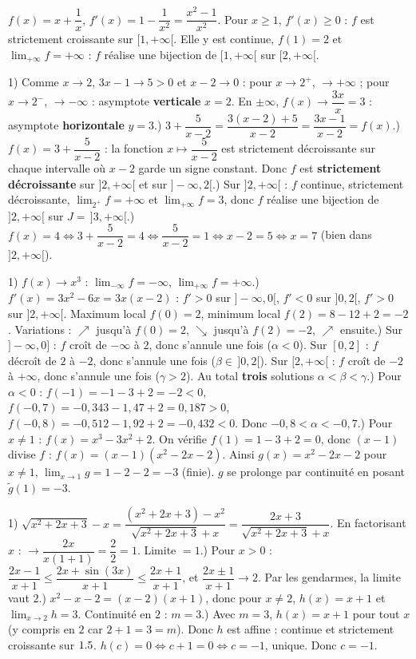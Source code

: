$f(x)=x+\dfrac1x$, $f'(x)=1-\dfrac1{x^{2}}=\dfrac{x^{2}-1}{x^{2}}$. Pour $x\ge1$, $f'(x)\ge0$ : $f$ est strictement croissante sur $[1,+\infty[$. Elle y est continue, $f(1)=2$ et $\displaystyle\lim_{+\infty}f=+\infty$ : $f$ réalise une bijection de $[1,+\infty[$ sur $[2,+\infty[$.

1) Comme $x\to2$, $3x-1\to5>0$ et $x-2\to0$ : pour $x\to2^{+}$, $\to+\infty$ ; pour $x\to2^{-}$, $\to-\infty$ : asymptote \textbf{verticale} $x=2$. En $\pm\infty$, $f(x)\to\dfrac{3x}{x}=3$ : asymptote \textbf{horizontale} $y=3$.) $3+\dfrac5{x-2}=\dfrac{3(x-2)+5}{x-2}=\dfrac{3x-1}{x-2}=f(x)$.) $f(x)=3+\dfrac5{x-2}$ : la fonction $x\mapsto\dfrac5{x-2}$ est strictement décroissante sur chaque intervalle où $x-2$ garde un signe constant. Donc $f$ est \textbf{strictement décroissante} sur $]2,+\infty[$ et sur $]-\infty,2[$.) Sur $]2,+\infty[$ : $f$ continue, strictement décroissante, $\displaystyle\lim_{2^{+}}f=+\infty$ et $\displaystyle\lim_{+\infty}f=3$, donc $f$ réalise une bijection de $]2,+\infty[$ sur $J=\,]3,+\infty[$.) $f(x)=4\Leftrightarrow 3+\dfrac5{x-2}=4\Leftrightarrow \dfrac5{x-2}=1\Leftrightarrow x-2=5\Leftrightarrow x=7$ (bien dans $]2,+\infty[$).

1) $f(x)\to x^{3}$ : $\displaystyle\lim_{-\infty}f=-\infty$, $\displaystyle\lim_{+\infty}f=+\infty$.) $f'(x)=3x^{2}-6x=3x(x-2)$ : $f'>0$ sur $]-\infty,0[$, $f'<0$ sur $]0,2[$, $f'>0$ sur $]2,+\infty[$. Maximum local $f(0)=2$, minimum local $f(2)=8-12+2=-2$. Variations : $\nearrow$ jusqu'à $f(0)=2$, $\searrow$ jusqu'à $f(2)=-2$, $\nearrow$ ensuite.) Sur $]-\infty,0]$ : $f$ croît de $-\infty$ à $2$, donc s'annule une fois ($\alpha<0$). Sur $[0,2]$ : $f$ décroît de $2$ à $-2$, donc s'annule une fois ($\beta\in\,]0,2[$). Sur $[2,+\infty[$ : $f$ croît de $-2$ à $+\infty$, donc s'annule une fois ($\gamma>2$). Au total \textbf{trois} solutions $\alpha<\beta<\gamma$.) Pour $\alpha<0$ : $f(-1)=-1-3+2=-2<0$, $f(-0{,}7)=-0{,}343-1{,}47+2=0{,}187>0$, $f(-0{,}8)=-0{,}512-1{,}92+2=-0{,}432<0$. Donc $-0{,}8<\alpha<-0{,}7$.) Pour $x\neq1$ : $f(x)=x^{3}-3x^{2}+2$. On vérifie $f(1)=1-3+2=0$, donc $(x-1)$ divise $f$ : $f(x)=(x-1)(x^{2}-2x-2)$. Ainsi $g(x)=x^{2}-2x-2$ pour $x\neq1$, $\displaystyle\lim_{x\to1}g=1-2-2=-3$ (finie). $g$ se prolonge par continuité en posant $\tilde g(1)=-3$.

1) $\sqrt{x^{2}+2x+3}-x=\dfrac{(x^{2}+2x+3)-x^{2}}{\sqrt{x^{2}+2x+3}+x}=\dfrac{2x+3}{\sqrt{x^{2}+2x+3}+x}$. En factorisant $x$ : $\to\dfrac{2x}{x(1+1)}=\dfrac{2}{2}=1$. Limite $=1$.) Pour $x>0$ : $\dfrac{2x-1}{x+1}\le\dfrac{2x+\sin(3x)}{x+1}\le\dfrac{2x+1}{x+1}$, et $\dfrac{2x\pm1}{x+1}\to2$. Par les gendarmes, la limite vaut $2$.) $x^{2}-x-2=(x-2)(x+1)$, donc pour $x\neq2$, $h(x)=x+1$ et $\displaystyle\lim_{x\to2}h=3$. Continuité en $2$ : $m=3$.) Avec $m=3$, $h(x)=x+1$ pour tout $x$ (y compris en $2$ car $2+1=3=m$). Donc $h$ est affine : continue et strictement croissante sur $1.5$. $h(c)=0\Leftrightarrow c+1=0\Leftrightarrow c=-1$, unique. Donc $c=-1$.
